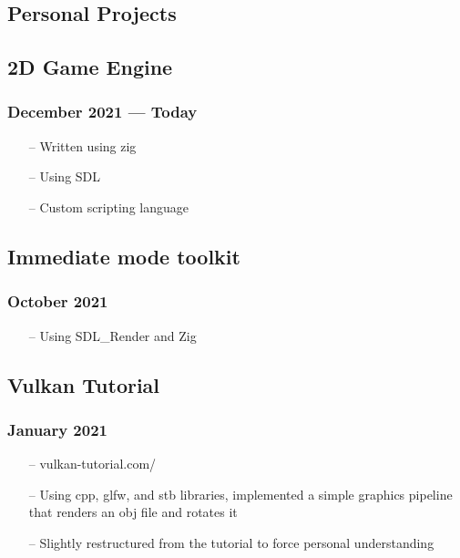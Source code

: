 \documentclass[11pt]{article}
\begin{document}
\begin{multicols}{2}
\columnbreak

\section{Personal Projects}

\subsection{2D Game Engine}
\subsubsection{December 2021 --- Today}
\begin{itemize}[noitemsep, topsep=0pt]
	\item[--] Written using zig
	\item[--] Using SDL
	\item[--] Custom scripting language
\end{itemize}

\subsection{Immediate mode toolkit}
\subsubsection{October 2021}
\begin{itemize}[noitemsep, topsep=0pt]
	\item[--] Using SDL\_Render and Zig
\end{itemize}

\subsection{Vulkan Tutorial}
\subsubsection{January 2021}
\begin{itemize}[noitemsep, topsep=0pt]
    \item[--] vulkan-tutorial.com/
	\item[--] Using cpp, glfw, and stb libraries, implemented a simple
        graphics pipeline that renders an obj file and rotates it
	\item[--] Slightly restructured from the tutorial 
        to force personal understanding
\end{itemize}

\end{multicols}
\end{document}
